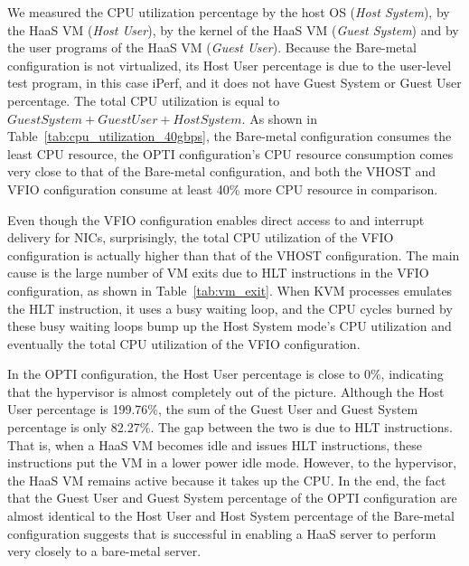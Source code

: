 We measured the CPU utilization percentage by the host OS ({\em Host System}),
by the HaaS VM ({\em Host User}), by the kernel of the HaaS VM ({\em Guest System})
and by the user programs of the HaaS VM ({\em Guest User}).
Because  the Bare-metal configuration is not virtualized, its Host User percentage is due to 
the user-level test program, in this case iPerf, and it does not have Guest System or 
Guest User percentage.
The total CPU utilization is equal to $Guest System + Guest User + Host System$.
As shown in Table~\ref{tab:cpu_utilization_40gbps}, 
the Bare-metal configuration consumes the least CPU resource,  
the OPTI configuration's CPU resource consumption comes very close to that of the Bare-metal configuration,
and both the VHOST and VFIO configuration consume at least 40\% more CPU resource in comparison.

Even though the VFIO configuration enables direct access to and interrupt delivery for NICs,
surprisingly, the total CPU utilization of the VFIO configuration is actually higher than that of 
the VHOST configuration. The main cause is the large number of VM exits due to HLT instructions in the VFIO configuration, as shown in Table~\ref{tab:vm_exit}. When KVM processes emulates the HLT instruction, it uses a busy waiting loop, and the CPU cycles burned by these busy waiting loops bump up the Host System mode's CPU utilization and eventually the total CPU utilization of the VFIO configuration.



In the OPTI configuration, the Host User percentage is close to 0\%, indicating that the hypervisor is almost 
completely out of the picture. Although the Host User percentage is 199.76\%, the sum of the Guest User and
Guest System percentage is only 82.27\%. The gap between the two is due to HLT instructions.
That is, when a HaaS VM becomes idle and issues HLT instructions, these instructions put the VM in a lower power
idle mode. However, to the hypervisor, the HaaS VM remains active because it takes up the CPU.
In the end, the fact that the Guest User and Guest System percentage of the OPTI configuration are almost 
identical to the Host User and Host System percentage of the Bare-metal configuration suggests that \na is successful in enabling a HaaS server
to perform very closely to a bare-metal server.

